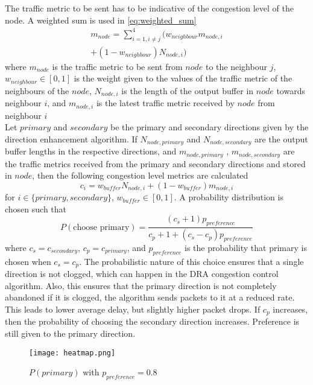 \documentclass[10pt,conference, final, letterpaper]{IEEEtran}
\begin{document}
The traffic metric to be sent has to be indicative of the congestion level of the node. A weighted sum is used in \eqref{eq:weighted_sum}
\begin{multline}
\label{eq:weighted_sum}
	m_{node} = \sum_{i=1, i\neq j}^4 (w_{neighbour}m_{node,i}\\ + (1-w_{neighbour})N_{node, i})
\end{multline}
where $m_{node}$ is the traffic metric to be sent from $node$ to the neighbour $j$, $w_{neighbour}\in [0,1]$ is the weight given to the values of the traffic metric of the neighbours of the $node$, $N_{node,i}$ is the length of the output buffer in $node$ towards neighbour $i$, and $m_{node, i}$ is the latest traffic metric received by $node$ from neighbour $i$ \\

Let $primary$ and $secondary$ be the primary and secondary directions given by the direction enhancement algorithm. If $N_{node, primary}$ and $N_{node,secondary}$ are the output buffer lengths in the respective directions, and $m_{node, primary}$ , $m_{node, secondary}$ are the traffic metrics received from the primary and secondary directions and stored in $node$, then the following congestion level metrics are calculated
\begin{equation}
	c_{i} = w_{buffer}N_{node,i} + (1-w_{buffer})m_{node, i}
\end{equation}
for $i \in \{primary, secondary\}$, $w_{buffer}\in [0,1]$. A probability distribution is chosen such that 
\begin{equation}
	P(\text{choose primary}) = \dfrac{(c_{s}+1)p_{preference}}{c_{p}+1 + (c_{s} - c_{p})p_{preference}}
\end{equation}
where $c_s = c_{secondary}$, $c_p = c_{primary}$, and $p_{preference}$ is the probability that primary is chosen when $c_s = c_p$. The probabilistic nature of this choice ensures that a single direction is not clogged, which can happen in the DRA congestion control algorithm. Also, this ensures that the primary direction is not completely abandoned if it is clogged, the algorithm sends packets to it at a reduced rate. This leads to lower average delay, but slightly higher packet drops. If $c_p$ increases, then the probability of choosing the secondary direction increases. Preference is still given to the primary direction. 
\begin{figure}
	\centering
	\texttt{[image: heatmap.png]}
	\caption{$P(primary)$ with $p_{preference}=0.8$}
\end{figure}
\end{document}
